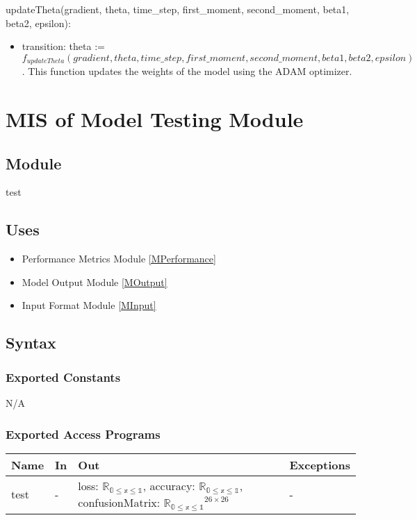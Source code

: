 \documentclass[12pt, titlepage]{article}
\begin{document}
\noindent updateTheta(gradient, theta, time\_step, first\_moment, second\_moment, beta1, beta2, epsilon):
\begin{itemize}
\item transition: theta := $f_{updateTheta}(gradient, theta, time\_step, first\_moment, second\_moment, beta1, beta2, epsilon)$. This function updates the weights of the model using the ADAM optimizer.
\end{itemize}


\section{MIS of Model Testing Module} \label{MTesting}

\subsection{Module}

test

\subsection{Uses}

\begin{itemize}
  \item Performance Metrics Module \ref{MPerformance}
  \item Model Output Module \ref{MOutput}
  \item Input Format Module \ref{MInput}
\end{itemize}

\subsection{Syntax}

\subsubsection{Exported Constants}

N/A

\subsubsection{Exported Access Programs}

\begin{center}
\begin{tabular}{p{2cm} p{2cm} p{6cm} p{2cm}}
\hline
\textbf{Name} & \textbf{In} & \textbf{Out} & \textbf{Exceptions} \\
\hline
test & - & loss: $\mathbb{R_{\text{0} \leq \text{x} \leq \text{1}}}$, accuracy: $\mathbb{R_{\text{0} \leq \text{x} \leq \text{1}}}$, confusionMatrix: $\mathbb{R_{\text{0} \leq \text{x} \leq \text{1}}}^{26 \times 26}$ & - \\
\hline
\end{tabular}
\end{center}
\end{document}
